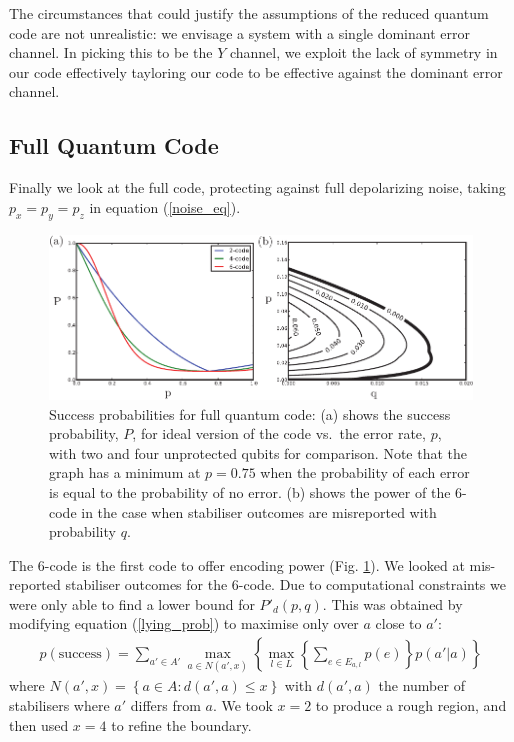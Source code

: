The circumstances that could justify the assumptions of the reduced quantum code are not unrealistic: we envisage a system with a single dominant error channel. In picking this to be the $Y$ channel, we exploit the lack of symmetry in our code effectively tayloring our code to be effective against the dominant error channel.

\subsection{Full Quantum Code}

Finally we look at the full code, protecting against full depolarizing noise, taking $p_x = p_y = p_z$ in equation (\ref{noise_eq}). 

\begin{figure}[htb]
  \begin{center}
    \includegraphics{assets/full_results.pdf}
  \end{center}
  \caption{Success probabilities for full quantum code: (a) shows the success probability, $P$, for ideal version of the code vs.\ the error rate, $p$, with two and four unprotected qubits for comparison. Note that the graph has a minimum at $p=0.75$ when the probability of each error is equal to the probability of no error. (b) shows the power of the $6$-code in the case when stabiliser outcomes are misreported with probability $q$.}
  \label{full_results}
\end{figure}

The $6$-code is the first code to offer encoding power (Fig. \ref{full_results}). We looked at mis-reported stabiliser outcomes for the $6$-code. Due to computational constraints we were only able to find a lower bound for $P'_d(p, q)$. This was obtained by modifying equation (\ref{lying_prob}) to maximise only over $a$ close to $a'$:
\begin{align} \label{approx_eq}
  p(\text{success})= \sum_{a'\in A'} \max_{a \in N(a',x)} \left\{ \max_{l \in L} \left\{\sum_{e \in E_{a,l}} p(e) \right\} p(a' \vert a) \right\}
\end{align}
where $N(a', x) = \left\{a \in A : d(a', a) \leq x \right\}$ with $d(a', a)$ the number of stabilisers where $a'$ differs from $a$. We took $x = 2$ to produce a rough region, and then used $x=4$ to refine the boundary. 

